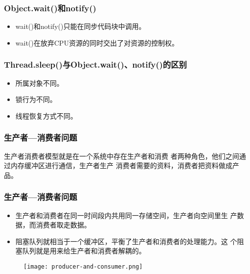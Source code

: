 \begin{frame}[fragile]
  \frametitle{Object.wait()和notify()}

  \begin{itemize}
  \item wait()和notify()只能在同步代码块中调用。
  \item wait()在放弃CPU资源的同时交出了对资源的控制权。
  \end{itemize}

\end{frame}

\begin{frame}[fragile]
  \frametitle{Thread.sleep()与Object.wait()、notify()的区别}
  
  \begin{itemize}[<+-|alert@+>]
  \item 所属对象不同。
\item 锁行为不同。
\item 线程恢复方式不同。
\end{itemize}
\end{frame}


\begin{frame}[fragile]
  \frametitle{生产者—消费者问题}

  生产者消费者模型就是在一个系统中存在{\hei\Red 生产者}和{\hei\Red 消费
    者}两种角色，他们之间通过{\hei\Blue 内存缓冲区}进行通信，生产者生产
  消费者需要的资料，消费者把资料做成产品。

\end{frame}

\begin{frame}[fragile]
  \frametitle{生产者—消费者问题}
  
  
  \begin{itemize}
  \item 生产者和消费者在同一时间段内共用同一存储空间，生产者向空间里生
    产数据，而消费者取走数据。
  \item 阻塞队列就相当于一个缓冲区，平衡了生产者和消费者的处理能力。这
    个阻塞队列就是用来给生产者和消费者解耦的。
    \end{itemize}

\begin{figure}
  \centering
  \texttt{[image: producer-and-consumer.png]}
\end{figure}

\end{frame}



